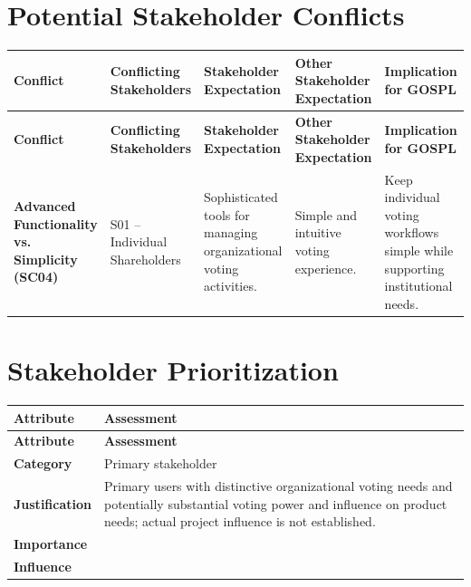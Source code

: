 \documentclass[11pt,a4paper]{article}
\begin{document}

\section*{Potential Stakeholder Conflicts}

\begingroup\small
\begin{longtable}{@{}>{\raggedright\arraybackslash}p{}>{\raggedright\arraybackslash}p{}>{\raggedright\arraybackslash}p{}>{\raggedright\arraybackslash}p{}>{\raggedright\arraybackslash}p{}@{}}
\toprule
\textbf{Conflict} & \textbf{Conflicting Stakeholders} & \textbf{Stakeholder Expectation} & \textbf{Other Stakeholder Expectation} & \textbf{Implication for GOSPL} \\
\midrule
\endfirsthead
\toprule
\textbf{Conflict} & \textbf{Conflicting Stakeholders} & \textbf{Stakeholder Expectation} & \textbf{Other Stakeholder Expectation} & \textbf{Implication for GOSPL} \\
\midrule
\endhead
\bottomrule
\endfoot
\textbf{Advanced Functionality vs. Simplicity (SC04)} & S01 -- Individual Shareholders & Sophisticated tools for managing organizational voting activities. & Simple and intuitive voting experience. & Keep individual voting workflows simple while supporting institutional needs. \\
\end{longtable}
\endgroup


\section*{Stakeholder Prioritization}


\begingroup\small
\begin{longtable}{@{}>{\raggedright\arraybackslash}p{}>{\raggedright\arraybackslash}p{}@{}}
\toprule
\textbf{Attribute} & \textbf{Assessment} \\
\midrule
\endfirsthead
\toprule
\textbf{Attribute} & \textbf{Assessment} \\
\midrule
\endhead
\bottomrule
\endfoot
\textbf{Category} & Primary stakeholder \\
\addlinespace
\textbf{Justification} & Primary users with distinctive organizational voting needs and potentially substantial voting power and influence on product needs; actual project influence is not established. \\
\addlinespace
\textbf{Importance} & 5 \\
\textbf{Influence} & 4 \\
\end{longtable}
\endgroup
\end{document}
